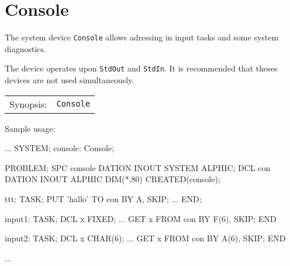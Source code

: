 \section{Console}
The system device \verb|Console| allows adressing in input tasks
and some system diagnostics.

The device operates upon \verb|StdOut| and \verb|StdIn|. 
It is recommended that theses devices are not used simultaneously.

\begin{tabular}{ll}
Synopsis: & \verb|Console| \\
\end{tabular}

Sample usage:
\begin{PEARLCode}
...
SYSTEM;
  console: Console;

PROBLEM;
   SPC console DATION INOUT SYSTEM ALPHIC;
   DCL con     DATION INOUT ALPHIC DIM(*,80) CREATED(console);

ttt: TASK;
   PUT 'hallo' TO con BY A, SKIP;
...
END;

input1: TASK;
   DCL x FIXED;
   ...
   GET x FROM con BY F(6), SKIP;
END

input2: TASK;
   DCL x CHAR(6);
   ...
   GET x FROM con BY A(6), SKIP;
END

...
\end{PEARLCode}


